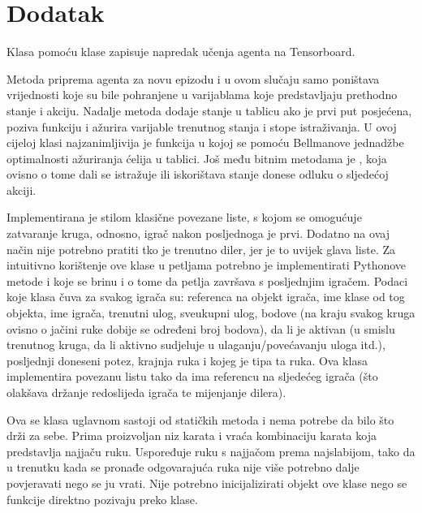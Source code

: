\section{Dodatak}
Klasa  pomoću klase  zapisuje napredak učenja agenta na Tensorboard.
\newpage

Metoda  priprema agenta za novu epizodu i u ovom slučaju samo poništava vrijednosti koje su bile pohranjene u varijablama koje predstavljaju prethodno stanje i akciju. Nadalje metoda  dodaje stanje u tablicu ako je prvi put posjećena, poziva funkciju  i ažurira varijable trenutnog stanja i stope istraživanja. U ovoj cijeloj klasi najzanimljivija je funkcija  u kojoj se pomoću Bellmanove jednadžbe optimalnosti ažuriranja ćelija u tablici. Još među bitnim metodama je , koja ovisno o tome dali se istražuje ili iskorištava stanje donese odluku o sljedećoj akciji.
\newpage

Implementirana je stilom klasične povezane liste, s kojom se omogućuje zatvaranje kruga, odnosno, igrač nakon posljednoga je prvi. Dodatno na ovaj način nije potrebno pratiti tko je trenutno diler, jer je to uvijek glava liste. Za intuitivno korištenje ove klase u petljama potrebno je implementirati Pythonove metode  i  koje se brinu i o tome da petlja završava s posljednjim igračem. Podaci koje klasa čuva za svakog igrača su: referenca na objekt igrača, ime klase od tog objekta, ime igrača, trenutni ulog, sveukupni ulog, bodove (na kraju svakog kruga ovisno o jačini ruke dobije se određeni broj bodova), da li je aktivan (u smislu trenutnog kruga, da li aktivno sudjeluje u ulaganju/povećavanju uloga itd.), posljednji doneseni potez, krajnja ruka i kojeg je tipa ta ruka. Ova klasa implementira povezanu listu tako da ima referencu na sljedećeg igrača (što olakšava držanje redoslijeda igrača te mijenjanje dilera).
\newpage

Ova se klasa uglavnom sastoji od statičkih metoda i nema potrebe da bilo što drži za sebe. Prima proizvoljan niz karata i vraća kombinaciju karata koja predstavlja najjaču ruku. Uspoređuje ruku s najjačom prema najslabijom, tako da u trenutku kada se pronađe odgovarajuća ruka nije više potrebno dalje povjeravati nego se ju vrati. Nije potrebno inicijalizirati objekt ove klase nego se funkcije direktno pozivaju preko klase.

\newpage

